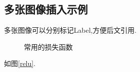 \subsection{多张图像插入示例}
\par 多张图像可以分别标记Label,方便后文引用.
\begin{figure}[!htbp]
    \centering
    \hfill
    \caption{常用的损失函数}    
    \label{activation function}
\end{figure}
\par 如图\ref{relu}.

